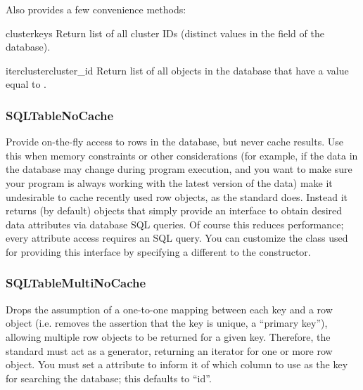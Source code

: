 \documentclass{howto}
\begin{document}
Also provides a few convenience methods:
\begin{funcdesc}{clusterkeys}{}
  Return list of all cluster IDs (distinct values in the 
  field of the database).
\end{funcdesc}
\begin{funcdesc}{itercluster}{cluster_id}
  Return list of all objects in the database that have a 
  value equal to .
\end{funcdesc}


\subsubsection{SQLTableNoCache}
Provide on-the-fly access to rows in the database, 
but never cache results.  Use this when memory constraints or other 
considerations (for example, if the data in the database may change
during program execution, and you want to make sure your program
is always working with the latest version of the data) 
make it undesirable to cache recently used row objects, as the
standard  does.  Instead it returns (by default)
 objects that simply provide an interface
to obtain desired data attributes via database SQL queries.
Of course this reduces performance; every attribute access
requires an SQL query.  You can customize the class used for
providing this interface by specifying a different 
to the constructor.

\subsubsection{SQLTableMultiNoCache}
Drops the assumption of a one-to-one
mapping between each key and a row object (i.e. removes the
assertion that the key is unique, a ``primary key''), allowing
multiple row objects to be returned for a given key.  Therefore,
the standard  must act as a generator, returning
an iterator for one or more row object.  You must set a 
 attribute to inform it of which 
column to use as the key for searching the database;
this defaults to ``id''.
\end{document}
